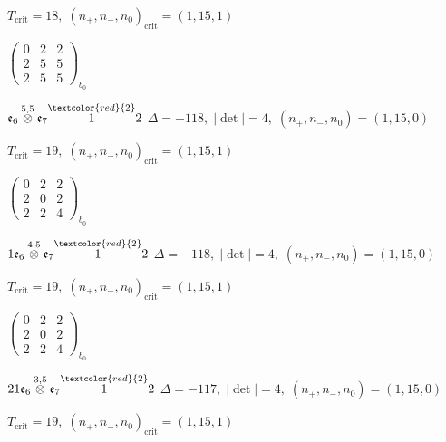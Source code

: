\documentclass[10pt]{article}
\begin{document}
\hspace{1em}$T_{\text{crit}}=18,\; (n_+,n_-,n_0)_{\text{crit}}=(1,15,1)$

\hspace{2em}$\left(\begin{smallmatrix}0 & 2 & 2 \\ 2 & 5 & 5 \\ 2 & 5 & 5\end{smallmatrix}\right)_{\!b_0}$

\smallskip

$\mathfrak{e}_6\overset{5,5}{\otimes}\mathfrak{e}_7\overset{\textcolor{red}{2}}{1}2$ \quad $\Delta=-118,\; |\det|=4,\; (n_+,n_-,n_0)=(1,15,0)$

\hspace{1em}$T_{\text{crit}}=19,\; (n_+,n_-,n_0)_{\text{crit}}=(1,15,1)$

\hspace{2em}$\left(\begin{smallmatrix}0 & 2 & 2 \\ 2 & 0 & 2 \\ 2 & 2 & 4\end{smallmatrix}\right)_{\!b_0}$

\smallskip

$1\mathfrak{e}_6\overset{4,5}{\otimes}\mathfrak{e}_7\overset{\textcolor{red}{2}}{1}2$ \quad $\Delta=-118,\; |\det|=4,\; (n_+,n_-,n_0)=(1,15,0)$

\hspace{1em}$T_{\text{crit}}=19,\; (n_+,n_-,n_0)_{\text{crit}}=(1,15,1)$

\hspace{2em}$\left(\begin{smallmatrix}0 & 2 & 2 \\ 2 & 0 & 2 \\ 2 & 2 & 4\end{smallmatrix}\right)_{\!b_0}$

\smallskip

$21\mathfrak{e}_6\overset{3,5}{\otimes}\mathfrak{e}_7\overset{\textcolor{red}{2}}{1}2$ \quad $\Delta=-117,\; |\det|=4,\; (n_+,n_-,n_0)=(1,15,0)$

\hspace{1em}$T_{\text{crit}}=19,\; (n_+,n_-,n_0)_{\text{crit}}=(1,15,1)$
\end{document}
